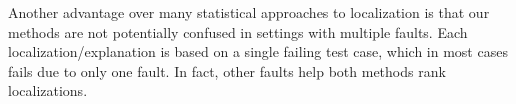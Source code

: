 Another advantage over many statistical approaches to 
localization is that our methods are not potentially confused in 
settings with multiple faults.  Each localization/explanation is based 
on a single failing test case, which in most cases fails due to only one 
fault.  In fact, other faults help both methods rank localizations.



